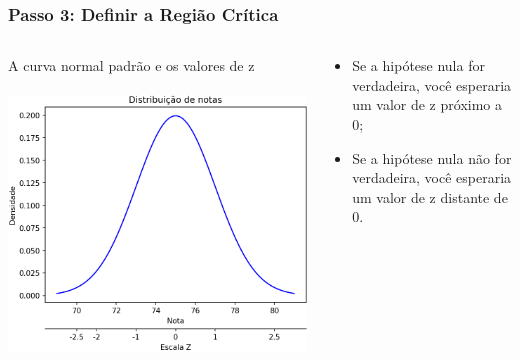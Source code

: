 \documentclass[11pt]{beamer}
\begin{document}
\begin{frame}
\frametitle{Passo 3: Definir a Região Crítica}
\begin{columns}
\begin{column}{0.5\textwidth}
   A curva normal padrão e os valores de z\\~\\
   \includegraphics[width=1\linewidth]{figs/two_xticks_under}
\end{column}
\begin{column}{0.5\textwidth}  %
   \begin{itemize}
   \item Se a hipótese nula for verdadeira, você esperaria um valor de z próximo a 0;
   \item Se a hipótese nula não for verdadeira, você esperaria um valor de z distante de 0.
   \end{itemize}
\end{column}
\end{columns}
\end{frame}
\end{document}
